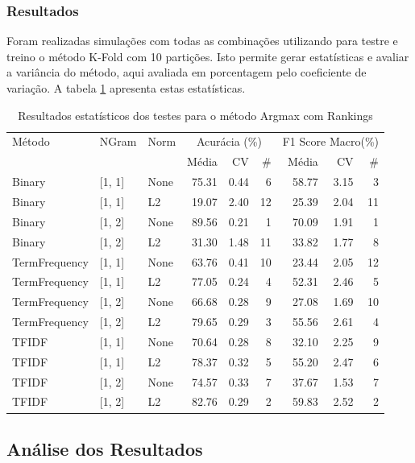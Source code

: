 \subsubsection{Resultados}

    Foram realizadas simulações com todas as combinações utilizando para testre e treino o método K-Fold com 10 partições.  Isto permite gerar estatísticas e avaliar a variância do método, aqui avaliada em porcentagem pelo coeficiente de variação.  A tabela \ref{tab:resultadoargmax_rankings} apresenta estas estatísticas.

\begin{table}[H]
\centering
\caption{Resultados estatísticos dos testes para o método Argmax com Rankings}
\label{tab:resultadoargmax_rankings}
\footnotesize %
\begin{tabular}{lllrrrrrr}
\hline
Método & NGram & Norm & \multicolumn{3}{c}{Acurácia (\%)} & \multicolumn{3}{c}{F1 Score Macro(\%)} \\
& & & Média & CV & \# & Média & CV & \# \\
\hline
Binary & [1, 1] & None & 75.31 & 0.44 & 6 & 58.77 & 3.15 & 3 \\
Binary & [1, 1] & L2 & 19.07 & 2.40 & 12 & 25.39 & 2.04 & 11 \\
Binary & [1, 2] & None & 89.56 & 0.21 & 1 & 70.09 & 1.91 & 1 \\
Binary & [1, 2] & L2 & 31.30 & 1.48 & 11 & 33.82 & 1.77 & 8 \\
TermFrequency & [1, 1] & None & 63.76 & 0.41 & 10 & 23.44 & 2.05 & 12 \\
TermFrequency & [1, 1] & L2 & 77.05 & 0.24 & 4 & 52.31 & 2.46 & 5 \\
TermFrequency & [1, 2] & None & 66.68 & 0.28 & 9 & 27.08 & 1.69 & 10 \\
TermFrequency & [1, 2] & L2 & 79.65 & 0.29 & 3 & 55.56 & 2.61 & 4 \\
TFIDF & [1, 1] & None & 70.64 & 0.28 & 8 & 32.10 & 2.25 & 9 \\
TFIDF & [1, 1] & L2 & 78.37 & 0.32 & 5 & 55.20 & 2.47 & 6 \\
TFIDF & [1, 2] & None & 74.57 & 0.33 & 7 & 37.67 & 1.53 & 7 \\
TFIDF & [1, 2] & L2 & 82.76 & 0.29 & 2 & 59.83 & 2.52 & 2 \\
\hline
\end{tabular}
\end{table}

\subsection{Análise dos Resultados}

